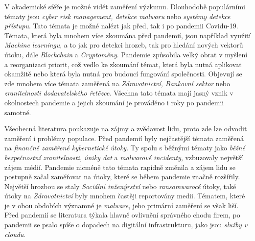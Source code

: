 V akademické sféře je možné vidět zaměření výzkumu.
Dlouhodobě populárními tématy jsou \textit{cyber risk management, detekce malwaru} nebo \textit{systémy detekce přístupu}.\cite{KUMAR2022102821}
Tato témata je možné nalézt jak před, tak i po pandemii Covidu-19.
Témata, která byla mnohem více zkoumána před pandemií, jsou například využití \textit{Machine learningu}, a to jak pro detekci hrozeb, tak pro hledání nových vektorů útoku, dále \textit{Blockchain} a \textit{Cryptoměny}.\cite{KUMAR2022102821}
Pandemie způsobila velký obrat v myšlení a reorganizaci priorit, což vedlo ke zkoumání témat, která byla nutná aplikovat okamžitě nebo která byla nutná pro budoucí fungování společnosti.
Objevují se zde mnohem více témata zaměřená na \textit{Zdravotnictví, Bankovní sektor} nebo \textit{zranitelnosti dodavatelského řetězce}.\cite{KUMAR2022102821}
Všechna tato témata mají jasný vznik v okolnostech pandemie a jejich zkoumání je prováděno i roky po pandemii samotné.

Všeobecná literatura poukazuje na zájmy a zvědavost lidu, proto zde lze odvodit zaměření i problémy populace.
Před pandemií byly nejčastější témata zaměřená na \textit{finančně zaměřené kybernetické útoky}.
Ty spolu s běžnými tématy jako \textit{běžné bezpečnostní zranitelnosti, úniky dat} a \textit{malwarové incidenty}, vzbuzovaly největší zájem médií.\cite{KUMAR2022102821}
Pandemie nicméně tato témata rapidně změnila a zájem lidu se postupně začal zaměřovat na útoky, které se během pandemie značně rozšířily.
Největší hrozbou se staly \textit{Sociální inženýrství} nebo \textit{ransomwarocé} útoky, také útoky na \textit{Zdravotnictví} byly mnohem častěji reportovány medii.
Tématem, které je v obou obdobích významné je \textit{malware}, jeho primární zaměření se však liší.
Před pandemií se literatura týkala hlavně ovlivnění správného chodu firem, po pandemii se psalo spíše o dopadech na digitální infrastrukturu, jako jsou \textit{služby v cloudu}.

